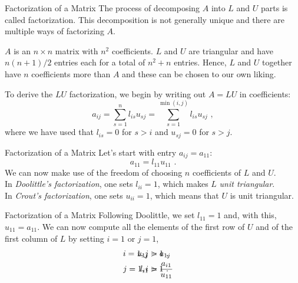 \documentclass[11pt]{beamer}
\begin{document}
\begin{frame}[fragile]{Factorization of a Matrix}
The process of decomposing $A$ into $L$ and $U$ parts is called
factorization. This decomposition
is not generally unique and there are multiple ways of factorizing $A$.

$A$ is an $n\times n$ matrix with $n^2$ coefficients. $L$ and $U$ are
triangular and have $n(n+1)/2$ entries each for a total of $n^2 + n$
entries. Hence, $L$ and $U$ together have $n$ coefficients more than
$A$ and these can be chosen to our own liking.

To derive the $LU$ factorization, we begin by writing out $A = LU$ in
coefficients:
\begin{equation}
a_{ij} = \sum_{s=1}^n l_{is} u_{sj} = \sum_{s = 1}^{\min(i,j)} l_{is} u_{sj}\,\,,
\end{equation}
where we have used that $l_{is} = 0$ for $s > i$ and $u_{sj} = 0$ for $s>j$.
\end{frame}

\begin{frame}[fragile]{Factorization of a Matrix}
Let's start with entry $a_{ij} = a_{11}$:
\begin{equation}
a_{11} = l_{11} u_{11}\,\,.
\end{equation}
We can now make use of the freedom of choosing $n$ coefficients
of $L$ and $U$. \\

In \emph{Doolittle's factorization}, one sets $l_{ii} = 1$, which
makes $L$ \emph{unit triangular}.\\

 In \emph{Crout's factorization},
one sets $u_{ii} = 1$, which means that $U$ is unit triangular.
\end{frame}

\begin{frame}[fragile]{Factorization of a Matrix}
 Following Doolittle, we set $l_{11} = 1$ and, with this, $u_{11} =
a_{11}$.  We can now compute all the elements of the first row of $U$
and of the first column of $L$ by setting $i=1$ or $j=1$,
\begin{align}
u_{1j} &= a_{1j} &\hspace{-2.5cm}i=1, j > 1\,\,,\nonumber\\
l_{i1} &= \frac{a_{i1}}{u_{11}} &\hspace{-2.5cm} j=1, i>1\,\,.
\end{align}
\end{frame}
\end{document}
